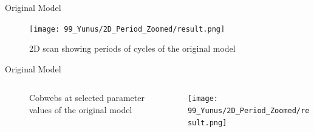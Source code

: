 \begin{frame}{Original Model}
	\begin{figure}
		\centering
		\texttt{[image: 99\_Yunus/2D\_Period\_Zoomed/result.png]}
		\caption*{2D scan showing periods of cycles of the original model}
	\end{figure}
\end{frame}

\begin{frame}{Original Model}
	\begin{columns}
		\begin{column}{.9 \textwidth}
			\vspace{-2em}
			\begin{center}
				\begin{figure}
					\centering
					\caption*{Cobwebs at selected parameter values of the original model}
				\end{figure}
			\end{center}
		\end{column}
		\begin{column}{.2 \textwidth}
			\vspace{-4em}
			\begin{center}
				\hspace{-2em}
				\texttt{[image: 99\_Yunus/2D\_Period\_Zoomed/result.png]}
			\end{center}
		\end{column}
	\end{columns}
\end{frame}

